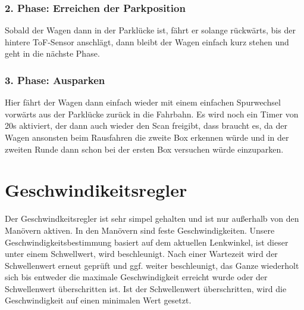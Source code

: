 \subsubsection{2. Phase: Erreichen der Parkposition}
Sobald der Wagen dann in der Parklücke ist, fährt er solange rückwärts, bis der hintere ToF-Sensor anschlägt, dann bleibt der Wagen einfach kurz stehen und geht in die nächste Phase.

\subsubsection{3. Phase: Ausparken}
Hier fährt der Wagen dann einfach wieder mit einem einfachen Spurwechsel vorwärts aus der Parklücke zurück in die Fahrbahn. Es wird noch ein Timer von 20s aktiviert, der dann auch wieder den Scan freigibt, dass braucht es, da der Wagen ansonsten beim Rausfahren die zweite Box erkennen würde und in der zweiten Runde dann schon bei der ersten Box versuchen würde einzuparken.

\section{Geschwindikeitsregler}
Der Geschwindkeitsregler ist sehr simpel gehalten und ist nur außerhalb von den Manövern aktiven. In den Manövern sind feste Geschwindigkeiten. Unsere Geschwindigkeitsbestimmung basiert auf dem aktuellen Lenkwinkel, ist dieser unter einem Schwellwert, wird beschleunigt. Nach einer Wartezeit wird der Schwellenwert erneut geprüft und ggf. weiter beschleunigt, das Ganze wiederholt sich bis entweder die maximale Geschwindigkeit erreicht wurde oder der Schwellenwert überschritten ist. Ist der Schwellenwert überschritten, wird die Geschwindigkeit auf einen minimalen Wert gesetzt.



